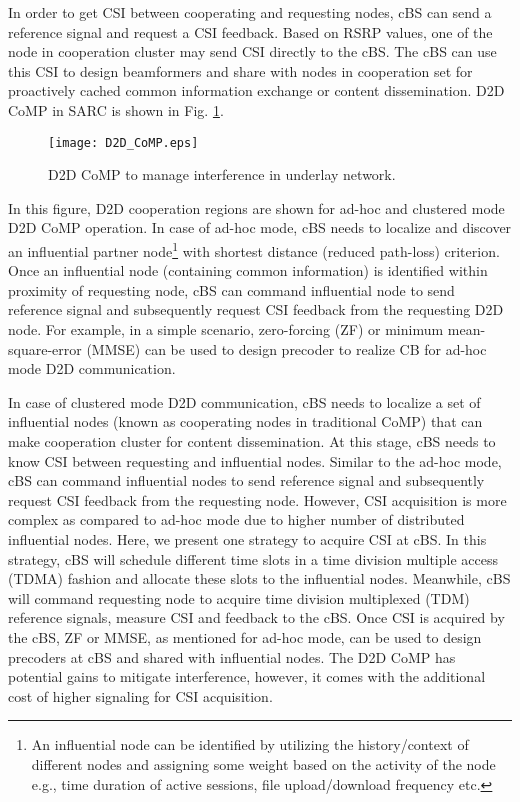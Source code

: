 \documentclass[article,10pt,twocolumn]{IEEEtran}
\begin{document}
In order to get CSI between cooperating and requesting nodes, cBS can send a reference signal and request a CSI feedback. Based on RSRP values, one of the node in cooperation cluster may send CSI directly to the cBS. The cBS can use this CSI to design beamformers and share with nodes in cooperation set for proactively cached common information exchange or content dissemination. D2D CoMP in SARC is shown in Fig. \ref{Figure:d2dCoMP}.
\begin{figure}[!htb]
\centering
\texttt{[image: D2D\_CoMP.eps]}
\caption{D2D CoMP to manage interference in underlay network.}\label{Figure:d2dCoMP}
\vspace{-4mm}
\end{figure}

In this figure, D2D cooperation regions are shown for ad-hoc and clustered mode D2D CoMP operation. In case of ad-hoc mode, cBS needs to localize and discover an influential partner node\footnote{An influential node can be identified by utilizing the history/context of different nodes and assigning some weight based on the activity of the node e.g., time duration of active sessions, file upload/download frequency etc.} with shortest distance (reduced path-loss) criterion. Once an influential node (containing common information) is identified within proximity of requesting node, cBS can command influential node to send reference signal and subsequently request CSI feedback from the requesting D2D node. For example, in a simple scenario, zero-forcing (ZF) or minimum mean-square-error (MMSE) \citep{6849319} can be used to design precoder to realize CB for ad-hoc mode D2D communication.
 
In case of clustered mode D2D communication, cBS needs to localize a set of influential nodes (known as cooperating nodes in traditional CoMP) that can make cooperation cluster for content dissemination. At this stage, cBS needs to know CSI between requesting and influential nodes. Similar to the ad-hoc mode, cBS can command influential nodes to send reference signal and subsequently request CSI feedback from the requesting node. However, CSI acquisition is more complex as compared to ad-hoc mode due to higher number of distributed influential nodes. Here, we present one strategy to acquire CSI at cBS. In this strategy, cBS will schedule different time slots in a time division multiple access (TDMA) fashion and allocate these slots to the influential nodes. Meanwhile, cBS will command requesting node to acquire time division multiplexed (TDM) reference signals, measure CSI and feedback to the cBS. Once CSI is acquired by the cBS, ZF or MMSE, as mentioned for ad-hoc mode, can be used to design precoders at cBS and shared with influential nodes. The D2D CoMP has potential gains to mitigate interference, however, it comes with the additional cost of higher signaling for CSI acquisition.
\end{document}
